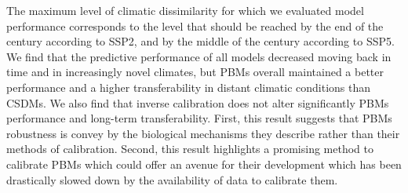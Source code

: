 \documentclass[pdflatex, sn-nature]{sn-jnl}%
\begin{document}
The maximum level of climatic dissimilarity for which we evaluated model performance corresponds to the level that should be reached by the end of the century according to SSP2, and by the middle of the century according to SSP5.  We find that the predictive performance of all models decreased moving back in time and in increasingly novel climates, but PBMs overall maintained a better performance and a higher transferability in distant climatic conditions than CSDMs. We also find that inverse calibration does not alter significantly PBMs performance and long-term transferability.  First, this result suggests that PBMs robustness is convey by the biological mechanisms they describe rather than their methods of calibration. Second, this result highlights a promising method to calibrate PBMs which could offer an avenue for their development which has been drastically slowed down by the availability of data to calibrate them.
\end{document}
